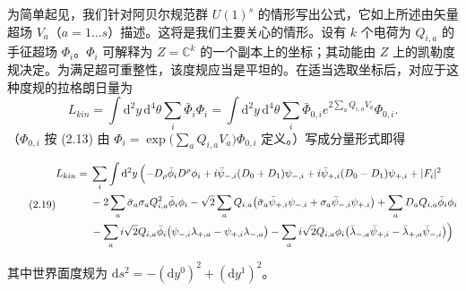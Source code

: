 为简单起见，我们针对阿贝尔规范群 $U(1)^s$ 的情形写出公式，它如上所述由矢量超场 $V_a$（$a=1\ldots s$）描述。这将是我们主要关心的情形。设有 $k$ 个电荷为 $Q_{i,a}$ 的手征超场 $\Phi_i$。$\Phi_i$ 可解释为 $Z=\mathbb{C}^k$ 的一个副本上的坐标；其动能由 $Z$ 上的凯勒度规决定。为满足超可重整性，该度规应当是平坦的。在适当选取坐标后，对应于这种度规的拉格朗日量为
\begin{equation}\tag{2.18}
L_{kin}=\int \mathrm{d}^{2}y\,\mathrm{d}^{4}\theta\sum_i\bar\Phi_i\Phi_i
=\int \mathrm{d}^{2}y\,\mathrm{d}^{4}\theta\sum_i\bar\Phi_{0,i}e^{2\sum_a Q_{i,a}V_a}\Phi_{0,i}.
\end{equation}
（$\Phi_{0,i}$ 按 (2.13) 由 $\Phi_i=\exp\bigl(\sum_a Q_{i,a}V_a\bigr)\Phi_{0,i}$ 定义。）写成分量形式即得

\label{op:11}

\begin{equation}\tag{2.19}
\begin{aligned}
L_{kin}={}&\sum_i\int \mathrm{d}^{2}y\,\Bigl(-D_\rho\bar\phi_i D^\rho\phi_i+i\bar\psi_{-,i}(D_0+D_1)\psi_{-,i}+i\bar\psi_{+,i}(D_0-D_1)\psi_{+,i}+|F_i|^2\\
&-2\sum_a\bar\sigma_a\sigma_a Q_{i,a}^2\bar\phi_i\phi_i-\sqrt{2}\sum_a Q_{i,a}\bigl(\bar\sigma_a\bar\psi_{+,i}\psi_{-,i}+\sigma_a\bar\psi_{-,i}\psi_{+,i}\bigr)+\sum_a D_a Q_{i,a}\bar\phi_i\phi_i\\
&-\sum_a i\sqrt{2}Q_{i,a}\bar\phi_i\bigl(\psi_{-,i}\lambda_{+,a}-\psi_{+,i}\lambda_{-,a}\bigr)-\sum_a i\sqrt{2}Q_{i,a}\phi_i\bigl(\bar\lambda_{-,a}\bar\psi_{+,i}-\bar\lambda_{+,a}\bar\psi_{-,i}\bigr)\Bigr)
\end{aligned}
\end{equation}


其中世界面度规为 $\mathrm{d}s^2=-(\mathrm{d}y^0)^2+(\mathrm{d}y^1)^2$。

